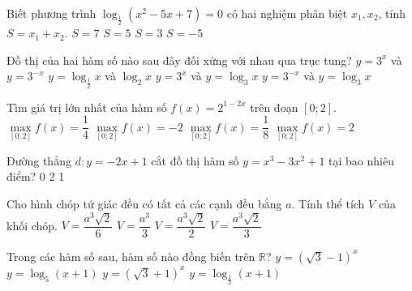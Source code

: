 \begin{ex}%
Biết phương trình $\log_{\frac{1}{2}}(x^2-5x+7)=0$ có hai nghiệm phân biệt $x_1, x_2$, tính $S=x_1+x_2$.
\choice
{$S=7$}
{\True  $S=5$}
{$S=3$}
{$S=-5$}
\end{ex}

\begin{ex}%
Đồ thị của hai hàm số nào sau đây đối xứng với nhau qua trục tung?
\choice
{\True  $y=3^x$ và $y=3^{-x}$}
{$y=\log_{\frac{1}{2}}x$ và $\log_2 x$}
{$y=3^x$ và $y=\log_3 x$}
{$y=3^{-x}$ và $y=\log_3 x$}
\end{ex}

\begin{ex}%
Tìm giá trị lớn nhất của hàm số $f(x)=2^{1-2x}$ trên đoạn $[0; 2]$.
\choice
{$\max\limits_{[0; 2]}f(x)=\dfrac{1}{4}$}
{$\max\limits_{[0; 2]}f(x)=-2$}
{$\max\limits_{[0; 2]}f(x)=\dfrac{1}{8}$}
{\True  $\max\limits_{[0; 2]}f(x)=2$}
\end{ex}

\begin{ex}%
Đường thẳng $d: y=-2x+1$ cắt đồ thị hàm số $y=x^3-3x^2+1$ tại bao nhiêu điểm?
\choice
{0}
{2}
{}
{1}
\end{ex}

\begin{ex}%
Cho hình chóp tứ giác đều có tất cả các cạnh đều bằng $a$. Tính thể tích $V$ của khối chóp.
\choice
{\True $V=\dfrac{a^3\sqrt{2}}{6}$}
{$V=\dfrac{a^3}{3}$}
{$V=\dfrac{a^3\sqrt{2}}{2}$}
{$V=\dfrac{a^3\sqrt{2}}{3}$}
\end{ex}

\begin{ex}%
Trong các hàm số sau, hàm số nào đồng biến trên $\mathbb{R}$?
\choice
{$y=\left(\sqrt{3}-1\right)^x$}
{$y=\log_5(x+1)$}
{\True $y=\left(\sqrt{3}+1\right)^x$}
{$y=\log_{\frac{1}{2}}(x+1)$}
\end{ex}

